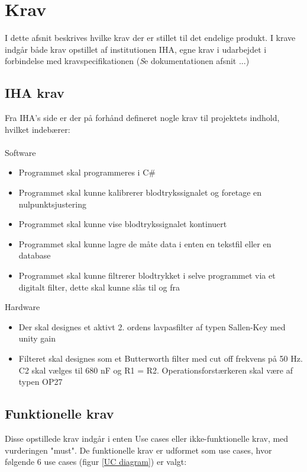 \chapter{Krav} \label{Krav}
I dette afsnit beskrives hvilke krav der er stillet til det endelige produkt. I krave indgår både krav opstillet af institutionen IHA, egne krav i udarbejdet i forbindelse med kravspecifikationen  (\textit Se dokumentationen afsnit ...) 
\section{IHA krav}
Fra IHA’s side er der på forhånd defineret nogle krav til projektets indhold, hvilket indebærer:\\ \\
Software 
\begin{itemize}
	\item Programmet skal programmeres i C\#
	\item Programmet skal kunne kalibrerer blodtrykssignalet og foretage en nulpunktsjustering
	\item Programmet skal kunne vise blodtrykssignalet kontinuert
	\item Programmet skal kunne lagre de måte data i enten en tekstfil eller en database
	\item Programmet skal kunne filtrerer blodtrykket i selve programmet via et digitalt filter, dette skal kunne slås til og fra
\end{itemize}

Hardware
\begin{itemize}
	\item Der skal designes et aktivt 2. ordens lavpasfilter af typen Sallen-Key med unity gain
	\item Filteret skal designes som et Butterworth filter med cut off frekvens på 50 Hz. C2 skal vælges til 680 nF og R1 = R2. Operationsforstærkeren skal være af typen OP27
\end{itemize}

\section{Funktionelle krav}
Disse opstillede krav indgår i enten Use cases eller ikke-funktionelle krav, med vurderingen "must". De funktionelle krav er udformet som use cases, hvor følgende 6 use cases (figur \ref{UC diagram}) er valgt:

